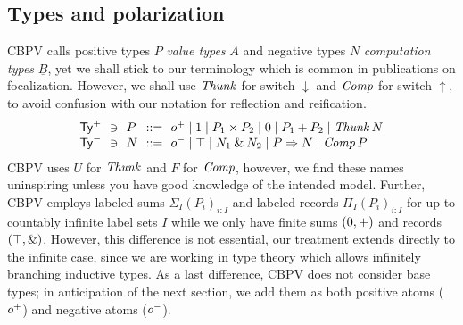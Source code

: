 \documentclass[sigplan,screen,fleqn,review]{acmart} %
\begin{document}
\subsection{Types and polarization}

CBPV calls positive types $P$ \emph{value types} $A$ and negative
types $N$
\emph{computation types} $\underline B$,
yet we shall stick to our terminology
which is common in publications on focalization.
However, we shall use $\mathit{Thunk}$ for switch $\downarrow$ and $\mathit{Comp}$ for
switch $\uparrow$, to avoid confusion with our notation for reflection
and reification.
\[
\begin{array}{l@{~~}l@{~~}l@{~~}r@{~~}l}%
  \PTy & \ni & P & ::= & \patom
    \mid \tyone \mid P_1 \times P_2
    \mid \tyzero \mid P_1 + P_2
    \mid \Thunk N
\\
  \NTy & \ni & N & ::= & \natom
    \mid \top \mid N_1 \ntimes N_2
    \mid P \To N
    \mid \Comp P
\\
\end{array}
\]
CBPV uses $U$ for $\mathit{Thunk}$ and $F$ for $\mathit{Comp}$, however, we find
these names uninspiring unless you have good knowledge of the intended
model.  Further, CBPV \cite{levy:hosc06}
employs labeled sums $\Sigma_I (P_i)_{i : I}$
and labeled records $\Pi_I (P_i)_{i : I}$ for up to countably infinite
label sets $I$ while we only have finite sums $(0,+)$ and
records $(\top,\mathbin{\&})$.  However, this difference is not essential,
our treatment extends directly to the infinite case, since we are
working in type theory which allows infinitely branching inductive
types.   As a last difference, CBPV does not consider base types; in
anticipation of the next section, we add them as both positive atoms
($o^+$) and negative atoms ($o^-$).
\end{document}
